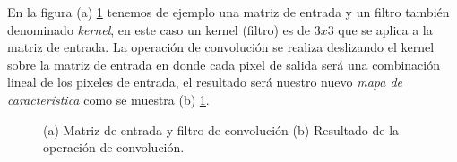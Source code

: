 En la figura (a) \ref{Fig:filter} tenemos de ejemplo una matriz de entrada y un filtro también denominado \textit{kernel}, en este caso un kernel (filtro) es de $3x3$ que se aplica a la matriz de entrada. La operación de convolución se realiza deslizando el kernel sobre la matriz de entrada en donde cada pixel de salida será una combinación lineal de los pixeles de entrada, el resultado será nuestro nuevo \textit{mapa de característica} como se muestra (b) \ref{Fig:filter}.

\begin{figure}[htbp]
\centering
{}%

\caption{(a) Matriz de entrada y filtro de convolución (b) Resultado de la operación de convolución.}\label{Fig:filter}
\end{figure}

